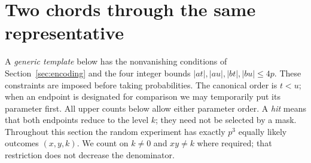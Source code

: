 \section{Two chords through the same representative}\label{sec:one}
A \emph{generic template} below has the nonvanishing conditions of Section~\ref{sec:encoding} and the four integer bounds $|at|,|au|,|bt|,|bu|\le4p$. These constraints are imposed before taking probabilities. The canonical order is $t<u$; when an endpoint is designated for comparison we may temporarily put its parameter first. All upper counts below allow either parameter order. A \emph{hit} means that both endpoints reduce to the level $k$; they need not be selected by a mask. Throughout this section the random experiment has exactly $p^3$ equally likely outcomes $(x,y,k)$. We count on $k\ne0$ and $xy\ne k$ where required; that restriction does not decrease the denominator.

